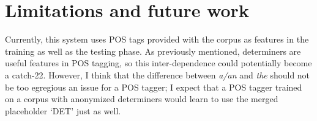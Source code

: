 \documentclass[11pt]{article}
\begin{document}
\section{Limitations and future work}

Currently, this system uses POS tags provided with the corpus as features in the training as well as the testing phase. As previously mentioned, determiners are useful features in POS tagging, so this inter-dependence could potentially become a catch-22. However, I think that the difference between \emph{a/an} and \emph{the} should not be too egregious an issue for a POS tagger; I expect that a POS tagger trained on a corpus with anonymized determiners would learn to use the merged placeholder `DET' just as well.





\end{document}
